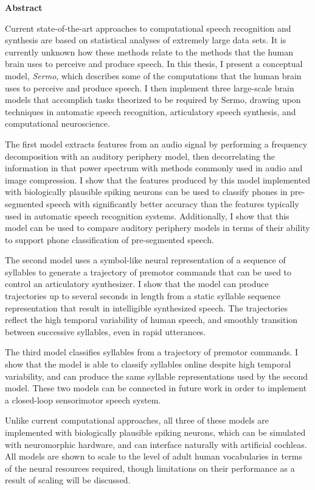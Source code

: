 {}
\begin{center}\textbf{Abstract}\end{center}

Current state-of-the-art approaches
to computational
speech recognition and synthesis
are based on statistical analyses
of extremely large data sets.
It is currently unknown how these methods
relate to the methods that the human brain
uses to perceive and produce speech.
In this thesis,
I present a conceptual model, \textit{Sermo},
which describes some of the computations that
the human brain uses to
perceive and produce speech.
I then implement three large-scale brain models
that accomplish tasks
theorized to be required by Sermo,
drawing upon techniques
in automatic speech recognition,
articulatory speech synthesis,
and computational neuroscience.

The first model extracts features
from an audio signal by
performing a frequency decomposition
with an auditory periphery model,
then decorrelating the information
in that power spectrum
with methods commonly used in
audio and image compression.
I show that the features produced
by this model implemented
with biologically plausible spiking neurons
can be used to classify phones in
pre-segmented speech with significantly
better accuracy than the features
typically used in
automatic speech recognition systems.
Additionally, I show that this model
can be used to compare auditory periphery models
in terms of their ability to
support phone classification of pre-segmented speech.

The second model
uses a symbol-like neural representation
of a sequence of syllables
to generate a trajectory of premotor commands
that can be used to control
an articulatory synthesizer.
I show that the model
can produce trajectories
up to several seconds in length
from a static syllable sequence representation
that result in
intelligible synthesized speech.
The trajectories reflect the
high temporal variability
of human speech,
and smoothly transition between
successive syllables,
even in rapid utterances.

The third model
classifies syllables
from a trajectory of premotor commands.
I show that the model is able to
classify syllables online
despite high temporal variability,
and can produce the same
syllable representations
used by the second model.
These two models can be connected
in future work in order to implement
a closed-loop sensorimotor speech system.

Unlike current computational approaches,
all three of these models are implemented
with biologically plausible spiking neurons,
which can be simulated with neuromorphic hardware,
and can interface naturally with artificial cochleas.
All models are shown to scale
to the level of adult human vocabularies
in terms of the neural resources required,
though limitations on their performance
as a result of scaling will be discussed.

\cleardoublepage
